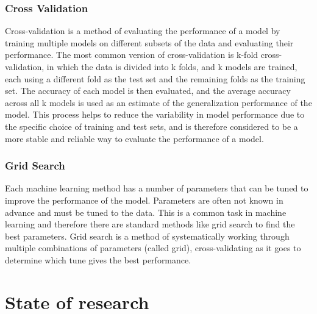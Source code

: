 \subsubsection{Cross Validation}
Cross-validation is a method of evaluating the performance of a model by training multiple models on different subsets of the data and evaluating their performance. The most common version of cross-validation is k-fold cross-validation, in which the data is divided into k folds, and k models are trained, each using a different fold as the test set and the remaining folds as the training set. 
The accuracy of each model is then evaluated, and the average accuracy across all k models is used as an estimate of the generalization performance of the model. This process helps to reduce the variability in model performance due to the specific choice of training and test sets, and is therefore considered to be a more stable and reliable way to evaluate the performance of a model. 
\cite[p. 252-260]{muller_introductionmachinelearning_2016}

\subsubsection{Grid Search}
Each machine learning method has a number of parameters that can be tuned to improve the performance of the model. Parameters are often not known in advance and must be tuned to the data. 
This is a common task in machine learning and therefore there are standard methods like grid search to find the best parameters. 
Grid search is a method of systematically working through multiple combinations of parameters (called grid), cross-validating as it goes to determine which tune gives the best performance.
\cite[p. 260-275]{muller_introductionmachinelearning_2016}


\section{State of research}

